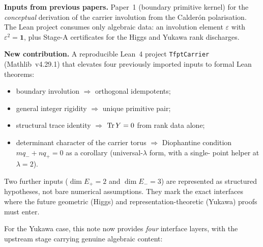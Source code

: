 \documentclass[11pt,a4paper]{article}
\begin{document}
\begin{tfptfrontbox}
\textbf{Inputs from previous papers.} Paper~1 (boundary primitive
kernel) for the \emph{conceptual} derivation of the carrier
involution from the Calder\'on polarisation. The Lean project
consumes only algebraic data: an involution element $\varepsilon$ with
$\varepsilon^2=\mathbf 1$, plus Stage-A certificates for the Higgs and
Yukawa rank discharges.

\textbf{New contribution.} A reproducible Lean~4 project
\texttt{TfptCarrier} (Mathlib~v4.29.1) that elevates four
previously imported inputs to formal Lean theorems:

\begin{itemize}[leftmargin=1.5em, itemsep=0pt]
    \item boundary involution $\Rightarrow$ orthogonal idempotents;
    \item general integer rigidity $\Rightarrow$ unique primitive pair;
    \item structural trace identity $\Rightarrow$ $\operatorname{Tr} Y=0$ from
          rank data alone;
    \item determinant character of the carrier torus
          $\Rightarrow$ Diophantine condition $m q_- + n q_+ = 0$
          as a corollary (universal-$\lambda$ form, with a single-
          point helper at $\lambda=2$).
\end{itemize}

Two further inputs ($\dim E_+=2$ and $\dim E_-=3$) are represented
as structured hypotheses, not bare numerical assumptions. They
mark the exact interfaces where the future geometric (Higgs) and
representation-theoretic (Yukawa) proofs must enter.

For the Yukawa case, this note now provides \emph{four}
interface layers, with the upstream stage carrying genuine
algebraic content:


\end{tfptfrontbox}
\end{document}
